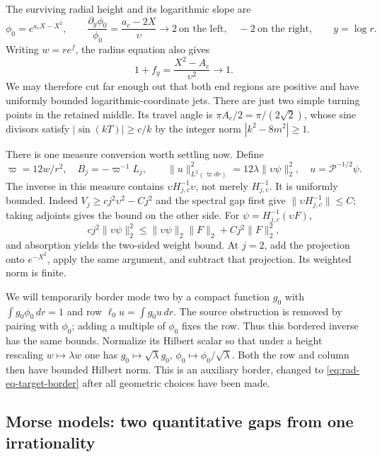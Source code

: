 The surviving radial height and its logarithmic slope are
\begin{equation}\label{eq:rad-eq-sc2}
 \phi_0=e^{a_cX-X^2},\qquad
 \frac{\partial_y\phi_0}{\phi_0}=\frac{a_c-2X}{\upsilon}
       \longrightarrow 2\ \text{on the left},\quad -2\ \text{on the right},
 \qquad y=\log r.
\end{equation}
Writing $w=re^f$, the radius equation also gives
\begin{equation}\label{eq:rad-eq-sc6b}
 1+f_y=\frac{X^2-A_c}{\upsilon^2}\longrightarrow1.
\end{equation}
We may therefore cut far enough out that both end regions are positive
and have uniformly bounded logarithmic-coordinate jets.  There are
just two simple turning points in the retained middle.  Its travel angle
is $\pi A_c/2=\pi/(2\sqrt2)$, whose sine divisors satisfy
$|\sin(kT)|\ge c/k$ by the integer norm $|k^2-8m^2|\ge1$.

There is one measure conversion worth settling now.  Define
\begin{equation}\label{eq:rad-eq-ha2}
 \varpi=12w/r^2,\quad B_j=-\varpi^{-1}L_j,
 \qquad
 \|u\|_{L^2(\varpi dr)}^2=12\lambda\|\upsilon\psi\|_2^2,
 \quad u=\mathcal P^{-1/2}\psi.
\end{equation}
The inverse in this measure contains
$\upsilon H_{j,c}^{-1}\upsilon$, not merely $H_{j,c}^{-1}$.
It is uniformly bounded.  Indeed
$V_j\ge c j^2\upsilon^2-Cj^2$ and the spectral gap first give
$\|\upsilon H_{j,c}^{-1}\|\le C$; taking adjoints gives the bound
on the other side.  For $\psi=H_{j,c}^{-1}(\upsilon F)$,
\[
 cj^2\|\upsilon\psi\|_2^2
 \le \|\upsilon\psi\|_2\|F\|_2+Cj^2\|F\|_2^2,
\]
and absorption yields the two-sided weight bound.  At $j=2$, add the
projection onto $e^{-X^2}$, apply the same argument, and subtract that
projection.  Its weighted norm is finite.

We will temporarily border mode two by a compact function $g_0$ with
$\int g_0\phi_0\,dr=1$ and row $\ell_0u=\int g_0u\,dr$.
The source obstruction is removed by pairing with $\phi_0$; adding a
multiple of $\phi_0$ fixes the row.  Thus this bordered inverse has the
same bounds.  Normalize its Hilbert scalar so that under a height
rescaling $w\mapsto\lambda w$ one has
$g_0\mapsto\sqrt\lambda g_0$, $\phi_0\mapsto\phi_0/\sqrt\lambda$.
Both the row and column then have bounded Hilbert norm.  This is an
auxiliary border, changed to \eqref{eq:rad-eq-target-border} after all
geometric choices have been made.

\subsection{Morse models: two quantitative gaps from one irrationality}

